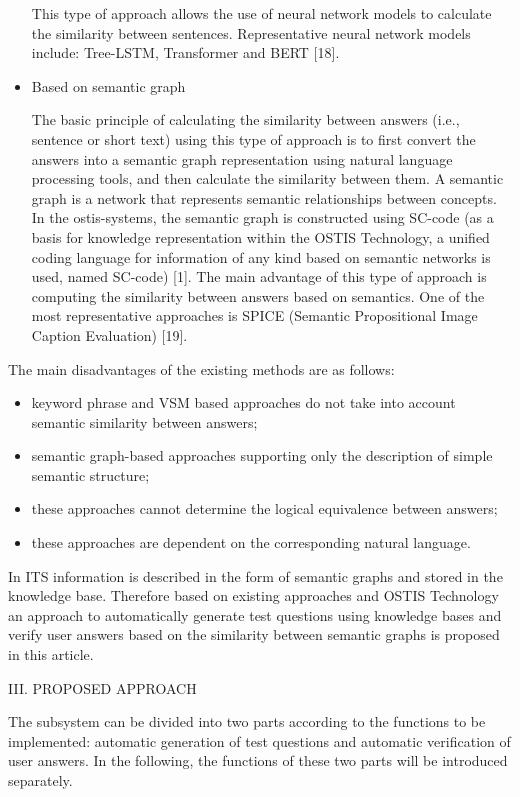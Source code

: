 \documentclass{article}
\begin{document}
\begin{multicols}{2}
\begin{itemize}
        This type of approach allows the use of neural network models to calculate the similarity between sentences. Representative neural network models include: Tree-LSTM, Transformer and BERT [18].
        \item Based on semantic graph
    
        The basic principle of calculating the similarity  between answers (i.e., sentence or short text) using this type of approach is to first convert the answers into a semantic graph representation using natural language processing tools, and then calculate the similarity between them. A semantic graph is a network that represents semantic relationships between concepts. In the ostis-systems, the semantic graph is constructed using SC-code (as a basis for knowledge representation within the OSTIS Technology, a unified coding language for information of any kind based on semantic networks is used, named SC-code) [1]. The main advantage of this type of approach is computing the similarity between answers based on semantics. One of the most representative approaches is SPICE (Semantic Propositional Image Caption Evaluation) [19].
    \end{itemize}

The main disadvantages of the existing methods are as
follows:
    \begin{itemize}
        \item keyword phrase and VSM based approaches do not take into account semantic similarity between answers;
        \item semantic graph-based approaches supporting only the description of simple semantic structure;
        \item these approaches cannot determine the logical equivalence between answers;
        \item these approaches are dependent on the corresponding natural language.
    \end{itemize}

In ITS information is described in the form of semantic graphs and stored in the knowledge base. Therefore based on existing approaches and OSTIS Technology an approach to automatically generate test questions using knowledge bases and verify user answers based on the similarity between semantic graphs is proposed in this article.

\begin{center}
    III. PROPOSED APPROACH
\end{center} 

The subsystem can be divided into two parts according to the functions to be implemented: automatic generation of test questions and automatic verification of user answers. In the following, the functions of these two parts will be introduced separately.


\end{multicols}
\end{document}
